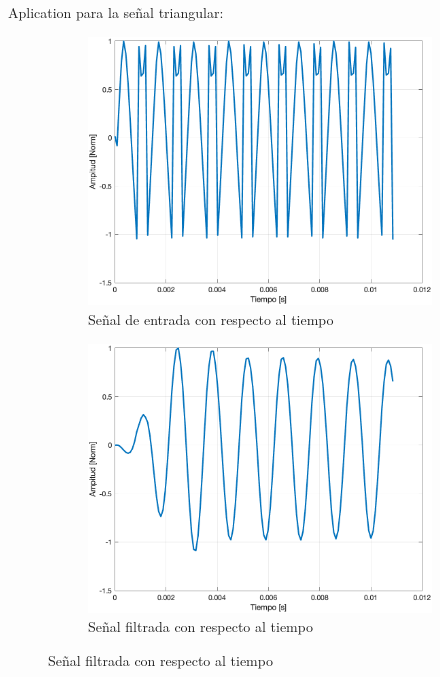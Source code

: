 \documentclass{article}
\begin{document}
Aplication para la señal triangular:
\begin{figure}[H]
    \centering
    \begin{subfigure}{.3\textwidth}
        \centering
        \includegraphics[width=\linewidth]{images/V2_entrada.png}
        \caption{Señal de entrada con respecto al tiempo}
        \label{fig:triangular_1}
    \end{subfigure}
    \hfill
    \begin{subfigure}{.3\textwidth}
        \centering
        \includegraphics[width=\linewidth]{images/V2_Salida.png}
        \caption{Señal filtrada con respecto al tiempo}
        \label{fig:triangular_2}

\end{subfigure}
\end{figure}
\end{document}
